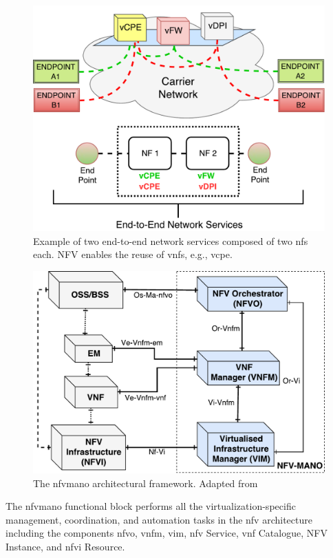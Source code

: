 \begin{figure}[t]
  \centering
  \includegraphics[scale=.45]{Figures/02_Background/ns}
    \caption{Example of two end-to-end network services composed of two \glspl{nf} each. NFV enables the reuse of \glspl{vnf}, e.g., \gls{vcpe}.}
    \label{nffg}
\end{figure}

\begin{figure}[t]
  \centering
  \includegraphics[scale=.4]{Figures/02_Background/MANO}
    \caption{The \gls{nfvmano} architectural framework. Adapted from \cite{ETSIIndustrySpecificationGroupISGNFV2014NetworkOptions}}
    \label{mano}
\end{figure}

The \gls{nfvmano} functional block performs all the virtualization-specific management, coordination, and automation tasks in the \gls{nfv} architecture including the components \gls{nfvo}, \gls{vnfm}, \gls{vim}, \gls{nfv} Service, \gls{vnf} Catalogue, NFV Instance, and \gls{nfvi} Resource. 

